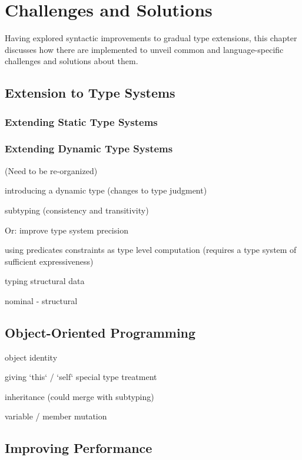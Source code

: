 
\renewcommand{\thechapter}{3}

\chapter{Challenges and Solutions}

Having explored syntactic improvements to gradual type extensions,
this chapter discusses how there are implemented to unveil common and language-specific
challenges and solutions about them.

\section{Extension to Type Systems}

\subsection{Extending Static Type Systems}

\subsection{Extending Dynamic Type Systems}

(Need to be re-organized)

introducing a dynamic type (changes to type judgment)

subtyping (consistency and transitivity)

Or: improve type system precision

using predicates
constraints as type level computation (requires a type system of sufficient expressiveness)

typing structural data

nominal
- structural

\section{Object-Oriented Programming}

object identity

giving `this` / `self` special type treatment

inheritance (could merge with subtyping)

variable / member mutation

\section{Improving Performance}

